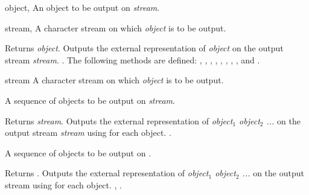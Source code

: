 \begin{optDefinition}
\begin{genericargs}
    \item[object, \classref{object}] An object to be output on {\em stream}.
    \item[stream, \classref{stream}] A character stream on which {\em
        object\/} is to be output.
\end{genericargs}
%
\result%
Returns {\em object}.
%
\remarks%
Outputs the external representation of {\em object\/} on the output stream {\em
    stream\/}.
%
\seealso%
.  The following  methods are
defined: ,
, ,
,
, ,
, ,
 and .

\begin{arguments}
    \item[stream] A character stream on which {\em object\/} is to
    be output.
    \item[{\optional{object$_1$ object$_2$ ...}}] A sequence of objects to be
    output on {\em stream}.
\end{arguments}
%
\result%
Returns {\em stream}.
%
\remarks%
Outputs the external representation of {\em object$_1$ object$_2$ ...} on the
output stream {\em stream\/} using  for each object.
%
\seealso%
.

\begin{arguments}
    \item[{\optional{object$_1$ object$_2$ ...}}] A sequence of objects to be
    output on .
\end{arguments}
%
\result%
Returns .
%
\remarks%
Outputs the external representation of {\em object$_1$ object$_2$ ...} on the
output stream  using  for each object.
%
\seealso%
, .


\end{optDefinition}
